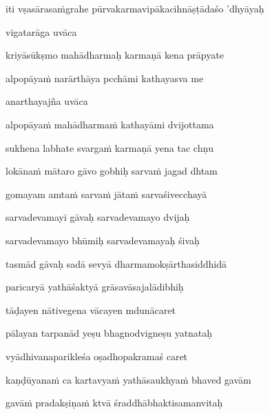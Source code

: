 \vers


\jump
\begin{center}
\ketdanda iti vṣasārasa\.mgrahe pūrvakarmavipākacihnāṣṭādaśo 'dhyāyaḥ\ketdanda
\end{center}
\dontdisplaylinenum\vers 

\vers
\bekveg\szamveg\vfill\phpspagebreak\szam\bek{}
\thispagestyle{empty}



\jump\jump
vigatarāga uvāca~{\dandab}\dontdisplaylinenum 

kriyāsūkṣmo mahādharmaḥ karmaṇā kena prāpyate\thinspace{\danda} \dontdisplaylinenum

alpopāya\.m narārthāya pcchāmi kathayasva me \veg\dontdisplaylinenum

anarthayajña uvāca~{\dandab}\dontdisplaylinenum 

alpopāya\.m mahādharma\.m kathayāmi dvijottama\thinspace{\danda} \dontdisplaylinenum

sukhena labhate svarga\.m karmaṇā yena tac chṇu \veg\dontdisplaylinenum

lokāna\.m mātaro gāvo gobhiḥ sarva\.m jagad dhtam\thinspace{\dandab} \dontdisplaylinenum

gomayam amta\.m sarva\.m jāta\.m sarvaśivecchayā \veg\dontdisplaylinenum

sarvadevamayī gāvaḥ sarvadevamayo dvijaḥ\thinspace{\dandab} \dontdisplaylinenum

sarvadevamayo bhūmiḥ sarvadevamayaḥ śivaḥ \veg\dontdisplaylinenum

tasmād gāvaḥ sadā sevyā dharmamokṣārthasiddhidā\thinspace{\dandab} \dontdisplaylinenum

paricaryā yathāśaktyā grāsavāsajalādibhiḥ \veg\dontdisplaylinenum

tāḍayen nātivegena vācayen mdunācaret\thinspace{\dandab} \dontdisplaylinenum

pālayan tarpanād yeṣu bhagnodvigneṣu yatnataḥ \veg\dontdisplaylinenum

vyādhivanaparikleśa oṣadhopakramaś caret\thinspace{\dandab} \dontdisplaylinenum

kaṇḍūyana\.m ca kartavya\.m yathāsaukhya\.m bhaved gavām \veg\dontdisplaylinenum

gavā\.m pradakṣiṇa\.m ktvā śraddhābhaktisamanvitaḥ\thinspace{\dandab} \dontdisplaylinenum

